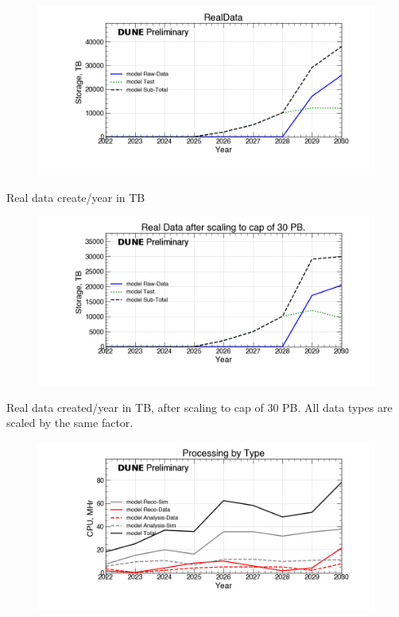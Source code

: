 
\begin{figure}[ht]
\centering\includegraphics[height=0.4\textwidth]{Feb24_noMWC_RealData-Storage.png}\end{figure}
\begin{table}[h]
\label{tab:realdata}
\caption{Real data create/year in TB}
\end{table}
\pagebreak
\begin{figure}[ht]
\centering\includegraphics[height=0.4\textwidth]{Feb24_noMWC_Real-Data-after-scaling-to-cap-of-30-PB.-Storage.png}\end{figure}
\begin{table}[h]
\label{tab:realdataCapped}
\caption{Real data created/year in TB, after scaling to cap of 30 PB.  All data types are scaled by the same factor. }
\end{table}
\pagebreak
\begin{figure}[ht]
\centering\includegraphics[height=0.4\textwidth]{Feb24_noMWC_Processing-by-Type-CPU.png}\end{figure}
